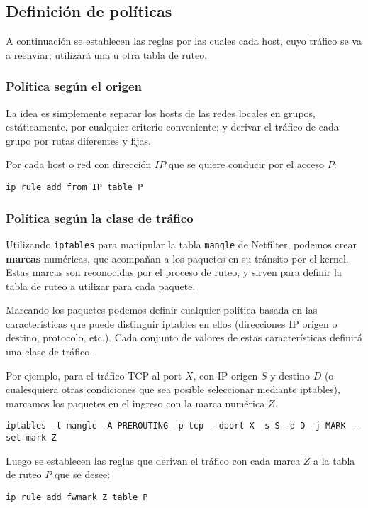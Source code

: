 \subsection{Definición de políticas}
A continuación se establecen las reglas por las cuales cada host, cuyo tráfico se va a reenviar, utilizará una u otra tabla de ruteo. 

\subsubsection{Política según el origen}
La idea es simplemente separar los hosts de las redes locales en grupos, estáticamente, por cualquier criterio conveniente; y derivar el tráfico de cada grupo por rutas diferentes y fijas. 

Por cada host o red con dirección $IP$ que se quiere conducir por el acceso $P$:
\begin{lstlisting}
ip rule add from IP table P 
\end{lstlisting}

\subsubsection{Política según la clase de tráfico}

Utilizando \texttt{iptables} para manipular la tabla \texttt{mangle} de Netfilter, podemos crear \textbf{marcas} numéricas, que acompañan a los paquetes en su tránsito por el kernel. Estas marcas son reconocidas por el proceso de ruteo, y sirven para definir la tabla de ruteo a utilizar para cada paquete.

Marcando los paquetes podemos definir cualquier política basada en las características que puede distinguir iptables en ellos (direcciones IP origen o destino, protocolo, etc.). Cada conjunto de valores de estas características definirá una clase de tráfico.

Por ejemplo, para el tráfico TCP al port $X$, con IP origen $S$ y destino $D$ (o cualesquiera otras condiciones que sea posible seleccionar mediante iptables), marcamos los paquetes en el ingreso con la marca numérica $Z$.
\begin{lstlisting}
iptables -t mangle -A PREROUTING -p tcp --dport X -s S -d D -j MARK --set-mark Z
\end{lstlisting}

Luego se establecen las reglas que derivan el tráfico con cada marca $Z$ a la tabla de ruteo $P$ que se desee:
\begin{lstlisting}
ip rule add fwmark Z table P
\end{lstlisting}


